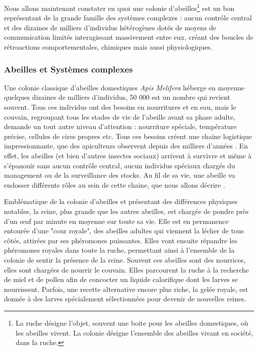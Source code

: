 			Nous allons maintenant constater en quoi une colonie d'abeilles\footnote{La ruche désigne l'objet, souvent une boite pour les abeilles domestiques, où les abeilles vivent. La colonie désigne l'ensemble des abeilles vivant en société, dans la ruche.} est un bon représentant de la grande famille des systèmes complexes : aucun contrôle central et des dizaines de milliers d'individus hétérogènes dotés de moyens de communication limités interagissant massivement entre eux, créant des boucles de rétroactions comportementales, chimiques mais aussi physiologiques.
			
			

	
		\subsubsection{Abeilles et Systèmes complexes}	
		\label{sectionBio}	
			Une colonie classique d'abeilles domestiques \textit{Apis Melifera} héberge en moyenne quelques dizaines de milliers d'individus, 50 000 est un nombre qui revient souvent. Tous ces individus ont des besoins en nourritures et en eau, mais le couvain, regroupant tous les stades de vie de l'abeille avant sa phase adulte, demande un tout autre niveau d'attention : nourriture spéciale, température précise, cellules de cires propres etc. Tous ces besoins créent une chaine logistique impressionnante, que des apiculteurs observent depuis des milliers d'années \cite{oldroyd_domestication_2012}. En effet, les abeilles (et bien d'autres insectes sociaux) arrivent à survivre et même à s'épanouir sans aucun contrôle central, aucun individus spéciaux chargés du management ou de la surveillance des stocks. Au fil de sa vie, une abeille va endosser différents rôles au sein de cette chaine, que nous allons décrire \cite{winston_biology_1991, winston_role_1991, seeley_age_1991}. 
			
			Emblématique de la colonie d'abeilles et présentant des différences physiques notables, la reine, plus grande que les autres abeilles, est chargée de pondre près d'un œuf par minute en moyenne sur toute sa vie. Elle est en permanence entourée d'une "cour royale", des abeilles adultes qui viennent la lécher de tous côtés, attirées par ses phéromones puissantes. Elles vont ensuite répandre les phéromones royales dans toute la ruche, permettant ainsi à l'ensemble de la colonie de sentir la présence de la reine. Souvent ces abeilles sont des nourrices, elles sont chargées de nourrir le couvain. Elles parcourent la ruche à la recherche de miel et de pollen afin de concocter un liquide calorifique dont les larves se nourrissent. Parfois, une recette alternative encore plus riche, la gelée royale, est donnée à des larves spécialement sélectionnées pour devenir de nouvelles reines.
			
